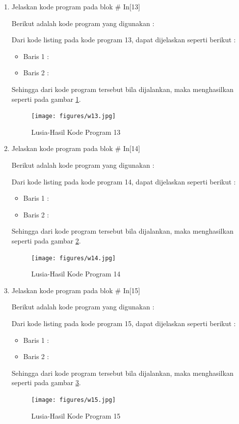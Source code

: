 \begin{enumerate}
\item Jelaskan kode program pada blok \# In[13]
	\par Berikut adalah kode program yang digunakan :
	
	\par Dari kode listing pada kode program 13, dapat dijelaskan seperti berikut :
	\begin{itemize}
	\item Baris 1	: 
	\item Baris 2	: 
	\end{itemize}
	\par Sehingga dari kode program tersebut bila dijalankan, maka menghasilkan seperti pada gambar \ref{7B13}.
		\begin{figure}[!hbtp]
		\centering
		\texttt{[image: figures/w13.jpg]}
		\caption{Lusia-Hasil Kode Program 13}
		\label{7B13}
		\end{figure}

\item Jelaskan kode program pada blok \# In[14]
	\par Berikut adalah kode program yang digunakan :
	
	\par Dari kode listing pada kode program 14, dapat dijelaskan seperti berikut :
	\begin{itemize}
	\item Baris 1	: 
	\item Baris 2	: 
	\end{itemize}
	\par Sehingga dari kode program tersebut bila dijalankan, maka menghasilkan seperti pada gambar \ref{7B14}.
		\begin{figure}[!hbtp]
		\centering
		\texttt{[image: figures/w14.jpg]}
		\caption{Lusia-Hasil Kode Program 14}
		\label{7B14}
		\end{figure}

\item Jelaskan kode program pada blok \# In[15]
\par Berikut adalah kode program yang digunakan :
	
	\par Dari kode listing pada kode program 15, dapat dijelaskan seperti berikut :
	\begin{itemize}
	\item Baris 1	: 
	\item Baris 2	: 
	\end{itemize}
	\par Sehingga dari kode program tersebut bila dijalankan, maka menghasilkan seperti pada gambar \ref{7B15}.
		\begin{figure}[!hbtp]
		\centering
		\texttt{[image: figures/w15.jpg]}
		\caption{Lusia-Hasil Kode Program 15}
		\label{7B15}
		\end{figure}


\end{enumerate}
